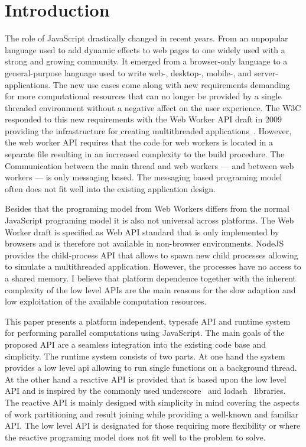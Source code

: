 \section{Introduction}\label{sec:introduction}
The role of JavaScript drastically changed in recent years. From an unpopular language used to add dynamic effects to web pages to one widely used with a strong and growing community. It emerged from a browser-only language to a general-purpose language used to write web-, desktop-, mobile-, and server-applications. The new use cases come along with new requirements demanding for more computational resources that can no longer be provided by a single threaded environment without a negative affect on the user experience. The W3C responded to this new requirements with the Web Worker API draft in 2009 providing the infrastructure for creating multithreaded applications~\cite{w3cWebWorker}. However, the web worker API requires that the code for web workers is located in a separate file resulting in an increased complexity to the build procedure. The Communication between the main thread and web workers --- and between web workers --- is only messaging based. The messaging based programing model often does not fit well into the existing application design. 

Besides that the programing model from Web Workers differs from the normal JavaScript programing model it is also not universal across platforms. The Web Worker draft is specified as Web API standard that is only implemented by browsers and is therefore not available in non-browser environments. NodeJS provides the child-process API that allows to spawn new child processes allowing to simulate a multithreaded application. However, the processes have no access to a shared memory. I believe that platform dependence together with the inherent complexity of the low level APIs are the main reasons for the slow adaption and low exploitation of the available computation resources.

This paper presents a platform independent, typesafe API and runtime system for performing parallel computations using JavaScript. The main goals of the proposed API are a seamless integration into the existing code base and simplicity. The runtime system consists of two parts. At one hand the system provides a low level api allowing to run single functions on a background thread. At the other hand a reactive API is provided that is based upon the low level API and is inspired by the commonly used underscore~\cite{underscorejs} and lodash~\cite{lodash} libraries. The reactive API is mainly designed with simplicity in mind covering the aspects of work partitioning and result joining while providing a well-known and familiar API. The low level API is designated for those requiring more flexibility or where the reactive programing model does not fit well to the problem to solve. 

